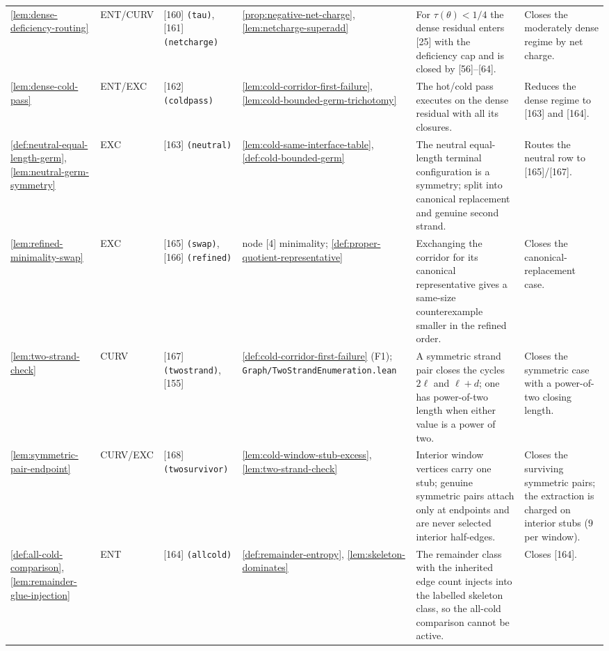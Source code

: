 \documentclass[11pt]{article}
\begin{document}
{\begin{longtable}{L{0.10\textwidth} C{0.045\textwidth} L{0.13\textwidth} L{0.135\textwidth} L{0.28\textwidth} L{0.20\textwidth}}
\cref{lem:dense-deficiency-routing} & ENT\slash CURV & [160] \texttt{(tau)}, [161] \texttt{(netcharge)} & \cref{prop:negative-net-charge}, \cref{lem:netcharge-superadd} & For \(\tau(\theta)<1/4\) the dense residual enters [25] with the deficiency cap and is closed by [56]--[64]. & Closes the moderately dense regime by net charge. \\
\cref{lem:dense-cold-pass} & ENT\slash EXC & [162] \texttt{(coldpass)} & \cref{lem:cold-corridor-first-failure}, \cref{lem:cold-bounded-germ-trichotomy} & The hot/cold pass executes on the dense residual with all its closures. & Reduces the dense regime to [163] and [164]. \\
\cref{def:neutral-equal-length-germ}, \cref{lem:neutral-germ-symmetry} & EXC & [163] \texttt{(neutral)} & \cref{lem:cold-same-interface-table}, \cref{def:cold-bounded-germ} & The neutral equal-length terminal configuration is a symmetry; split into canonical replacement and genuine second strand. & Routes the neutral row to [165]/[167]. \\
\cref{lem:refined-minimality-swap} & EXC & [165] \texttt{(swap)}, [166] \texttt{(refined)} & node [4] minimality; \cref{def:proper-quotient-representative} & Exchanging the corridor for its canonical representative gives a same-size counterexample smaller in the refined order. & Closes the canonical-replacement case. \\
\cref{lem:two-strand-check} & CURV & [167] \texttt{(twostrand)}, [155] & \cref{def:cold-corridor-first-failure} (F1); \texttt{Graph/TwoStrandEnumeration.lean} & A symmetric strand pair closes the cycles \(2\ell\) and \(\ell+d\); one has power-of-two length when either value is a power of two. & Closes the symmetric case with a power-of-two closing length. \\
\cref{lem:symmetric-pair-endpoint} & CURV\slash EXC & [168] \texttt{(twosurvivor)} & \cref{lem:cold-window-stub-excess}, \cref{lem:two-strand-check} & Interior window vertices carry one stub; genuine symmetric pairs attach only at endpoints and are never selected interior half-edges. & Closes the surviving symmetric pairs; the extraction is charged on interior stubs (\(9\) per window). \\
\cref{def:all-cold-comparison}, \cref{lem:remainder-glue-injection} & ENT & [164] \texttt{(allcold)} & \cref{def:remainder-entropy}, \cref{lem:skeleton-dominates} & The remainder class with the inherited edge count injects into the labelled skeleton class, so the all-cold comparison cannot be active. & Closes [164]. \\

\end{longtable}}
\end{document}

